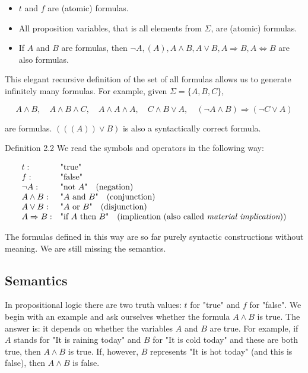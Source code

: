 \documentclass[10pt]{book}
\begin{document}
\begin{itemize}
  \item $t$ and $f$ are (atomic) formulas.
  \item All proposition variables, that is all elements from $\Sigma$, are (atomic) formulas.
  \item If $A$ and $B$ are formulas, then $\neg A,(A), A \wedge B, A \vee B, A \Rightarrow B, A \Leftrightarrow B$ are also formulas.
\end{itemize}

This elegant recursive definition of the set of all formulas allows us to generate infinitely many formulas. For example, given $\Sigma=\{A, B, C\}$,

$$
A \wedge B, \quad A \wedge B \wedge C, \quad A \wedge A \wedge A, \quad C \wedge B \vee A, \quad(\neg A \wedge B) \Rightarrow(\neg C \vee A)
$$

are formulas. $(((A)) \vee B)$ is also a syntactically correct formula.

Definition 2.2 We read the symbols and operators in the following way:

\[
\begin{array}{ll}
t: & \text{"true"} \\
f: & \text{"false"} \\
\neg A: & \text{"not } A \text{"} \quad \text{(negation)} \\
A \wedge B: & \text{"} A \text{ and } B \text{"} \quad \text{(conjunction)} \\
A \vee B: & \text{"} A \text{ or } B \text{"} \quad \text{(disjunction)} \\
A \Rightarrow B: & \text{"if } A \text{ then } B \text{"} \quad \text{(implication (also called }\emph{material implication}\text{))}
\end{array}
\]

The formulas defined in this way are so far purely syntactic constructions without meaning. We are still missing the semantics.

\subsection{Semantics}
In propositional logic there are two truth values: $t$ for "true" and $f$ for "false". We begin with an example and ask ourselves whether the formula $A \wedge B$ is true. The answer is: it depends on whether the variables $A$ and $B$ are true. For example, if $A$ stands for "It is raining today" and $B$ for "It is cold today" and these are both true, then $A \wedge B$ is true. If, however, $B$ represents "It is hot today" (and this is false), then $A \wedge B$ is false.
\end{document}
